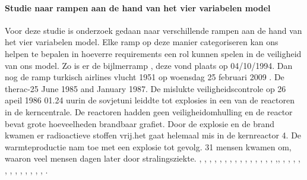 \paragraph{Studie naar rampen aan de hand van het vier variabelen model}
Voor deze studie is onderzoek gedaan naar verschillende rampen aan de hand van het vier variabelen model.
Elke ramp op deze manier categoriseren  kan ons helpen te bepalen in hoeverre requirements een rol kunnen spelen in de veiligheid van ons model.  Zo is er de bijlmerramp \cite{aviationsafety04101992airplaneCrashBijlmer}
, deze vond plaats op 04/10/1994. Dan nog de  ramp turkisch airlines vlucht 1951 op woensdag 25 februari 2009 \cite{catsr25022009Boeing737AmsterdamCrash}
\cite{zuilen23022019Tijdlijnpoldercrash}
\cite{wikinews04032009techfoutailines1951}
\cite{luchtvaartnieuws21012020boeing737conclusies}
\cite{adformatie280220209communicatiegebreken}
\cite{spinnael25022009onderzoekpolderbaancrash}
\cite{crashTurkishAirlines}
\cite{flightradar24}
\cite{flightstatstracker}. 
De therac-25 June 1985 and January 1987. 
De mislukte veiligheidscontrole op 26 apeil 1986 01.24 uurin de sovjetuni leiddte tot explosies in een van de reactoren in de kerncentrale. De reactoren hadden geen veiligheidomhulling en de reactor bevat grote hoeveelheden brandbaar grafiet.
Door de explosie en de brand kwamen er radioactieve stoffen vrij.het gaat helemaal mis in de kernreactor 4. De warmteproductie nam  toe met een explosie tot gevolg.
31 mensen kwamen om, waaron veel mensen dagen later door stralingsziekte.	\cite{rogaway2004therac25},
\cite{wikiTherac25}, 
\cite{lynch2017theracRaceConditions},	\cite{lim1998theracdisaster}, 
\cite{fabio26102015therac25},	 	\cite{ethicsunwrappedTherac25}, 	\cite{casesHistoryTherac25},	 	\cite{caballero2019Therac25}, 	\cite{rose1994theracFatalDose}, 	\cite{levesonMITTherac25},
\cite{grant1978theracevaluation},	 	\cite{turnerTheracAccidentsInvestigations},	\cite{turner1993TheracAccidentsInvestigations}, 	\cite{wang2017industrialdesignengineering}, 	\cite{levesonturner1993theracpart2},	\cite{porelloTheraccFailure},\cite{theracIncidents}, 
\cite{huffbrown2004casestudyethicatherac}, 
\cite{sebowikimedicalradiation},	\cite{hsia1995testtherac25},	\cite{magsilvaTheracTesting},
\cite{chemeuropetherac25},	\cite{statsenko10102016Therackillerbug},	\cite{therac25casestudy},	\cite{thomas1994theracinLotos},	\cite{twitter2019programmerbehindtherac},	\cite{wikibookstherac}, 
\cite{bozdagTherac25},	\cite{levesonTurnerTheracAbstract}, 	\cite{stackexchange2021therac25code}.
